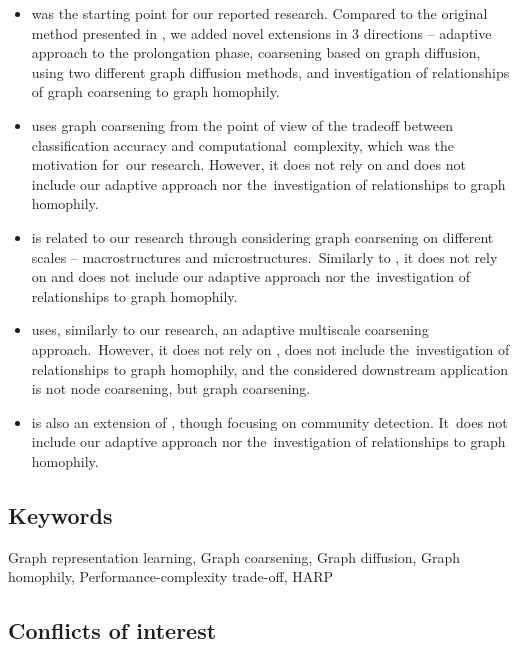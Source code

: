 \documentclass[sn-mathphys,pdflatex]{sn-jnl}%
\begin{document}
\begin{itemize}
  \item \cite{chen_harp_2018} was the starting point for our reported research. Compared to the original  method presented in \cite{chen_harp_2018}, we added novel extensions in 3 directions -- adaptive approach to the prolongation phase, coarsening based on graph diffusion, using two different graph diffusion methods, and investigation of relationships of graph coarsening to graph homophily.
  \item \cite{huang_scaling_2021} uses graph coarsening from the point of view of the tradeoff between classification accuracy and computational complexity, which was the motivation for our research. However, it does not rely on \cite{chen_harp_2018} and does not include our adaptive approach nor the investigation of relationships to graph homophily.
  \item \cite{bethune_hierarchical_2020} is related to our research through considering graph coarsening on different scales -- macrostructures and microstructures. Similarly to \cite{huang_scaling_2021}, it does not rely on \cite{chen_harp_2018} and does not include our adaptive approach nor the investigation of relationships to graph homophily.
  \item \cite{xie_graph_2020} uses, similarly to our research, an adaptive multiscale coarsening approach. However, it does not rely on \cite{chen_harp_2018}, does not include the investigation of relationships to graph homophily, and the considered downstream application is not node coarsening, but graph coarsening.
  \item \cite{zhang_harp_2021} is also an extension of \cite{chen_harp_2018}, though focusing on community detection. It does not include our adaptive approach nor the investigation of relationships to graph homophily.
\end{itemize}

\subsection*{Keywords}

Graph representation learning, Graph coarsening, Graph diffusion, Graph homophily, Performance-complexity trade-off, HARP

\subsection*{Conflicts of interest}
\end{document}
